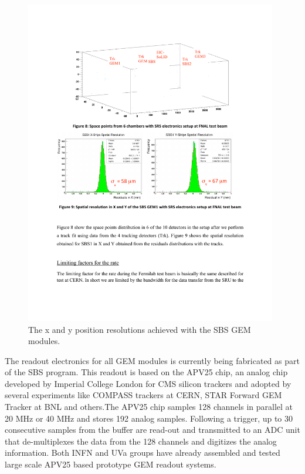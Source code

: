 \begin{figure}[h]
  \begin{center}
    \includegraphics[width=0.98\textwidth]{figures/GEM_res.pdf}
  \end{center}
  \caption{\label{GEM_res} The x and y position resolutions achieved with the SBS GEM modules. }
\end{figure} 

The readout electronics for all GEM modules is currently being fabricated as part of the SBS program. This readout is based on the APV25 chip,  an analog chip developed by Imperial College London for CMS silicon trackers and 
adopted by several experiments like COMPASS trackers at CERN, STAR Forward GEM Tracker  at BNL and others.The APV25 chip samples 128 channels in parallel at 20  MHz or 40 MHz and stores 192 analog samples.  Following a trigger,  up to  30 consecutive samples from the buffer are read-out and transmitted to an ADC unit that de-multiplexes the data from the 128 channels and digitizes the analog information. Both INFN and UVa groups have already assembled and tested large scale  APV25 based prototype GEM readout systems. 

